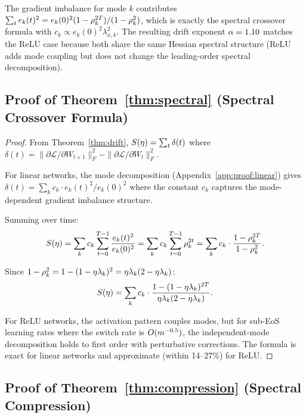 The gradient imbalance for mode $k$ contributes $\sum_t e_k(t)^2 = e_k(0)^2(1-\rho_k^{2T})/(1-\rho_k^2)$, which is exactly the spectral crossover formula with $c_k \propto e_k(0)^2\lambda_{x,k}^2$. The resulting drift exponent $\alpha = 1.10$ matches the ReLU case because both share the same Hessian spectral structure (ReLU adds mode coupling but does not change the leading-order spectral decomposition).

\subsection{Proof of Theorem~\ref{thm:spectral} (Spectral Crossover Formula)}
\label{app:proof:spectral}

\begin{proof}
From Theorem~\ref{thm:drift}, $S(\eta) = \sum_t \delta(t)$ where $\delta(t) = \|\partial\mathcal{L}/\partial W_{l+1}\|_F^2 - \|\partial\mathcal{L}/\partial W_l\|_F^2$.

For linear networks, the mode decomposition (Appendix~\ref{app:proof:linear}) gives $\delta(t) = \sum_k c_k \cdot e_k(t)^2 / e_k(0)^2$ where the constant $c_k$ captures the mode-dependent gradient imbalance structure.

Summing over time:
\begin{equation}
    S(\eta) = \sum_k c_k \sum_{t=0}^{T-1} \frac{e_k(t)^2}{e_k(0)^2} = \sum_k c_k \sum_{t=0}^{T-1} \rho_k^{2t} = \sum_k c_k \cdot \frac{1 - \rho_k^{2T}}{1 - \rho_k^2}.
\end{equation}

Since $1 - \rho_k^2 = 1 - (1-\eta\lambda_k)^2 = \eta\lambda_k(2-\eta\lambda_k)$:
\begin{equation}
    S(\eta) = \sum_k c_k \cdot \frac{1 - (1-\eta\lambda_k)^{2T}}{\eta\lambda_k(2-\eta\lambda_k)}.
\end{equation}

For ReLU networks, the activation pattern couples modes, but for sub-EoS learning rates where the switch rate is $O(m^{-0.5})$, the independent-mode decomposition holds to first order with perturbative corrections. The formula is exact for linear networks and approximate (within 14--27\%) for ReLU.
\end{proof}

\subsection{Proof of Theorem~\ref{thm:compression} (Spectral Compression)}
\label{app:proof:compression}


